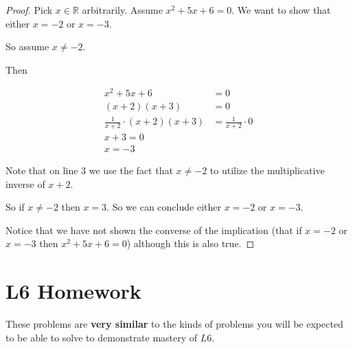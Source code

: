 \begin{proof}
		Pick $x \in \mathbb{R}$ arbitrarily. Assume $x^2 + 5x + 6 =0$.  We want to show that either $x=-2$ or $x=-3$.
		
		So assume $x \neq -2$.
		
		Then
		
		\begin{align}
			x^2 + 5x + 6 &=0\\
			(x+2)(x+3) &=0\\
			\frac{1}{x+2} \cdot (x+2)(x+3) &=\frac{1}{x+2} \cdot 0\\
			 x + 3 = 0\\
			 x = -3
		\end{align}
	
	Note that on line $3$ we use the fact that $x \neq -2$ to utilize the multiplicative inverse of $x+2$.
	
	So if $x \neq -2$ then $x=3$.  So we can conclude either $x = -2$ or $x = -3$.
	
	Notice that we have not shown the converse of the implication (that if $x = -2$ or $x=-3$ then $x^2 +5x + 6 = 0$) although this is also true.
	\end{proof}

\newpage

\section{L6 Homework}

 These problems are \textbf{very similar} to the kinds of problems you will be expected to be able to solve to demonstrate mastery of $L6$.
 
